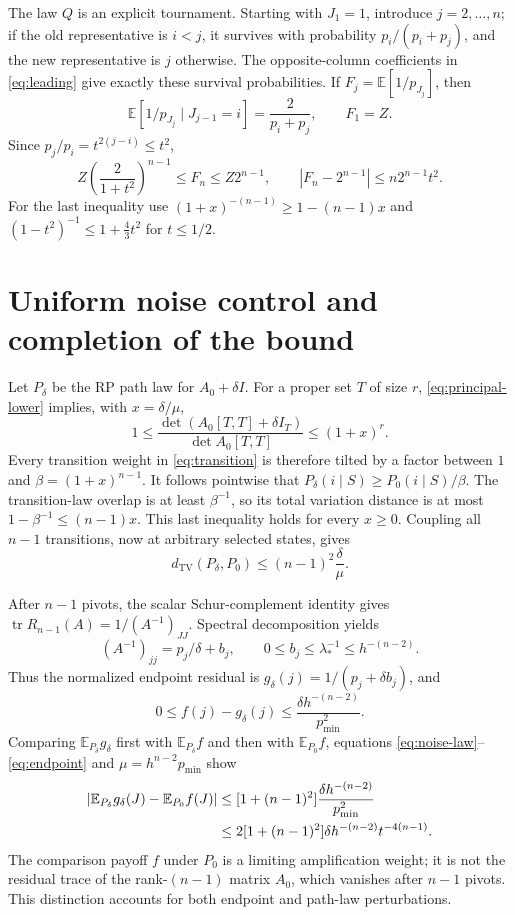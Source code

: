 \documentclass[10pt,letterpaper]{article}
\DeclareMathOperator{\tr}{tr}
\newcommand{\E}{\mathbb E}
\newcommand{\TV}{d_{\mathrm{TV}}}
\begin{document}
The law $Q$ is an explicit tournament. Starting with $J_1=1$, introduce
$j=2,\ldots,n$; if the old representative is $i<j$, it survives with
probability $p_i/(p_i+p_j)$, and the new representative is $j$ otherwise.
The opposite-column coefficients in \eqref{eq:leading} give exactly
these survival probabilities. If $F_j=\E[1/p_{J_j}]$, then
\[
 \E[1/p_{J_j}\mid J_{j-1}=i]=\frac2{p_i+p_j},
 \qquad F_1=Z.
\]
Since $p_j/p_i=t^{2(j-i)}\leq t^2$,
\begin{equation}\label{eq:tournament}
 Z\left(\frac2{1+t^2}\right)^{n-1}\leq F_n\leq Z2^{n-1},
 \qquad |F_n-2^{n-1}|\leq n2^{n-1}t^2.
\end{equation}
For the last inequality use $(1+x)^{-(n-1)}\geq1-(n-1)x$ and
$(1-t^2)^{-1}\leq1+\frac43t^2$ for $t\leq1/2$.

\section{Uniform noise control and completion of the bound}\label{sec:noise}

Let $P_\delta$ be the RP path law for $A_0+\delta I$. For a proper set
$T$ of size $r$, \eqref{eq:principal-lower} implies, with $x=\delta/\mu$,
\[
 1\leq\frac{\det(A_0[T,T]+\delta I_T)}{\det A_0[T,T]}
 \leq(1+x)^r.
\]
Every transition weight in \eqref{eq:transition} is therefore tilted by
a factor between $1$ and $\beta=(1+x)^{n-1}$. It follows pointwise that
$P_\delta(i\mid S)\geq P_0(i\mid S)/\beta$. The transition-law overlap
is at least $\beta^{-1}$, so its total variation distance is at most
$1-\beta^{-1}\leq(n-1)x$. This last inequality holds for every $x\geq0$.
Coupling all $n-1$ transitions, now at arbitrary selected states, gives
\begin{equation}\label{eq:noise-law}
 \TV(P_\delta,P_0)\leq(n-1)^2\frac{\delta}{\mu}.
\end{equation}

After $n-1$ pivots, the scalar Schur-complement identity gives
$\tr R_{n-1}(A)=1/(A^{-1})_{JJ}$. Spectral decomposition yields
\[
 (A^{-1})_{jj}=p_j/\delta+b_j,
 \qquad 0\leq b_j\leq\lambda_*^{-1}\leq h^{-(n-2)}.
\]
Thus the normalized endpoint residual is
$g_\delta(j)=1/(p_j+\delta b_j)$, and
\begin{equation}\label{eq:endpoint}
 0\leq f(j)-g_\delta(j)
 \leq\frac{\delta h^{-(n-2)}}{p_{\min}^2}.
\end{equation}
Comparing $\E_{P_\delta}g_\delta$ first with $\E_{P_\delta}f$ and
then with $\E_{P_0}f$, equations \eqref{eq:noise-law}--\eqref{eq:endpoint}
and $\mu=h^{n-2}p_{\min}$ show
\begin{align}
 \left|\E_{P_\delta}g_\delta(J)-\E_{P_0}f(J)\right|
 &\leq[1+(n-1)^2]\frac{\delta h^{-(n-2)}}{p_{\min}^2}\notag\\
 &\leq2[1+(n-1)^2]\delta h^{-(n-2)}t^{-4(n-1)}.
 \label{eq:noise-error}
\end{align}
The comparison payoff $f$ under $P_0$ is a limiting amplification weight;
it is not the residual trace of the rank-$(n-1)$ matrix $A_0$, which
vanishes after $n-1$ pivots. This distinction accounts for both endpoint
and path-law perturbations.
\end{document}
